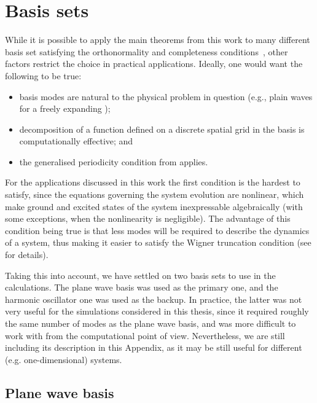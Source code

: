 \chapter{Basis sets}
\label{cha:appendix:bases}

While it is possible to apply the main theorems from this work to many different basis set satisfying the orthonormality and completeness conditions~, other factors restrict the choice in practical applications.
Ideally, one would want the following to be true:
\begin{itemize}
    \item basis modes are natural to the physical problem in question (e.g., plain waves for a freely expanding );
    \item decomposition of a function defined on a discrete spatial grid in the basis is computationally effective; and
    \item the generalised periodicity condition from  applies.
\end{itemize}

For the applications discussed in this work the first condition is the hardest to satisfy, since the equations governing the system evolution are nonlinear, which make ground and excited states of the system inexpressable algebraically (with some exceptions, when the nonlinearity is negligible).
The advantage of this condition being true is that less modes will be required to describe the dynamics of a system, thus making it easier to satisfy the Wigner truncation condition (see  for details).

Taking this into account, we have settled on two basis sets to use in the calculations.
The plane wave basis was used as the primary one, and the harmonic oscillator one was used as the backup.
In practice, the latter was not very useful for the simulations considered in this thesis, since it required roughly the same number of modes as the plane wave basis, and was more difficult to work with from the computational point of view.
Nevertheless, we are still including its description in this Appendix, as it may be still useful for different (e.g. one-dimensional) systems.


\section{Plane wave basis}


